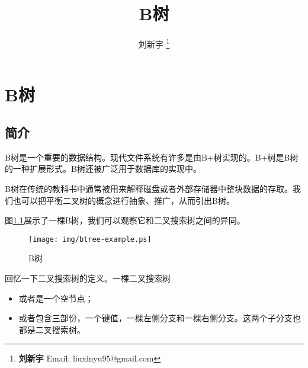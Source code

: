 \documentclass[UTF8]{article}
\begin{document}


\title{B树}

\author{刘新宇
\thanks{{\bfseries 刘新宇 } \newline
  Email: liuxinyu95@gmail.com \newline}
  }

\maketitle
\fi


\ifx\wholebook\relax
\chapter{B树}
\fi


\section{简介}
\label{introduction}

B树是一个重要的数据结构。现代文件系统有许多是由B+树实现的。B+树是B树的一种扩展形式。B树还被广泛用于数据库的实现中。

B树在传统的教科书中通常被用来解释磁盘或者外部存储器中整块数据的存取\cite{CLRS}。我们也可以把平衡二叉树的概念进行抽象、推广，从而引出B树\cite{wiki-b-tree}。

图\ref{fig:btree-example}展示了一棵B树，我们可以观察它和二叉搜索树之间的异同。

\begin{figure}[htbp]
   \begin{center}
	\texttt{[image: img/btree-example.ps]}
   \caption{B树} \label{fig:btree-example}
   \end{center}
\end{figure}

回忆一下二叉搜索树的定义。一棵二叉搜索树
\begin{itemize}
\item 或者是一个空节点；
\item 或者包含三部份，一个键值，一棵左侧分支和一棵右侧分支。这两个子分支也都是二叉搜索树。
\end{itemize}
\end{document}

